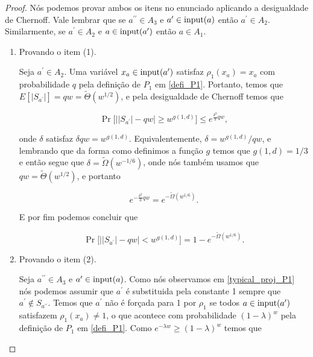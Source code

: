 \begin{proof}

Nós podemos provar ambos os itens no enunciado aplicando a desigualdade de Chernoff. Vale lembrar que se $a^{\prime \prime} \in A_{3}$ e $a^{\prime} \in \text{input}(a)$ então $a^{\prime} \in A_{2}$. Similarmente, se $a^{\prime} \in A_{2}$ e $a \in \text{input}(a^{\prime})$ então $a \in A_{1}$.

\begin{enumerate}

	\item Provando o item (1).
	
	Seja $a^{\prime} \in A_{2}$. Uma variável $x_{a} \in \text{input}(a^{\prime})$  satisfaz $\rho_{1}(x_{a}) = x_{a}$ com probabilidade $q$ pela definição de $P_{1}$ em \ref{defi_P1}. Portanto, temos que $E[\lvert S_{a^{\prime}} \rvert] = qw = \widetilde{\Theta}(w^{1/2})$, e pela desigualdade de Chernoff temos que
	
	\begin{equation*}
		\Pr \Big[\big\lvert \lvert S_{a^{\prime}} \rvert - qw \big\rvert \geq w^{g(1, d)} \Big] \leq e^{\frac{\delta^{2}}{3}qw},
	\end{equation*}
	
	onde $\delta$ satisfaz $\delta qw = w^{g(1, d)}$. Equivalentemente, $\delta = w^{g(1, d)}/qw$, e lembrando que da forma como definimos a função $g$ temos que $g(1, d) = 1/3$ e então segue que $\delta = \widetilde{\Omega}(w^{-1/6})$, onde nós também usamos que $qw = \widetilde{\Theta}(w^{1/2})$, e portanto
	
	\begin{equation*}
		e^{-\frac{\delta^{2}}{3}qw} = e^{-\widetilde{\Omega}(w^{1/6})}.
	\end{equation*}
	
	E por fim podemos concluir que
	
	\begin{equation*}
		\Pr \Big[ \big\lvert \lvert S_{a^{\prime}} \rvert - qw \big\rvert < w^{g(1, d)}\Big] = 1 - e^{-\widetilde{\Omega}(w^{1/6})}.
	\end{equation*}
	
	
	\item Provando o item (2).
	
	Seja $a^{\prime \prime} \in A_{3}$ e $a^{\prime} \in \text{input}(a)$. Como nós observamos em \ref{typical_proj_P1} nós podemos assumir que $a^{\prime}$ é substituida pela constante 1 sempre que $a^{\prime} \not\in S_{a^{\prime \prime}}$. Temos que $a^{\prime}$ não é forçada para 1 por $\rho_{1}$ se todos $a \in \text{input}(a^{\prime})$ satisfazem $\rho_{1}(x_{a}) \neq 1$, o que acontece com probabilidade $(1 - \lambda)^{w}$ pela definição de $P_{1}$ em \ref{defi_P1}. Como $e^{-\lambda w} \geq (1 - \lambda)^{w}$ temos que
	

\end{enumerate}
\end{proof}
